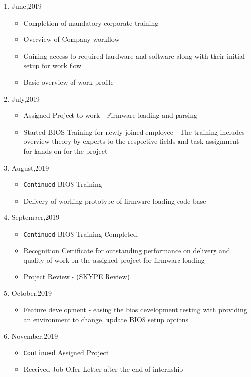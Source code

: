 \begin{enumerate}
    \item June,2019
    	\begin{itemize}
    		\item Completion of mandatory corporate training
    		\item Overview of Company workflow
    		\item Gaining access to required hardware and software along with their initial setup for work flow
    		\item Basic overview of work profile
    	\end{itemize}
    \item July,2019
    	\begin{itemize}
    		\item Assigned Project to work - Firmware loading and parsing
    		\item Started BIOS Training for newly joined employee - The training includes overview theory by experts to the respective fields and task assignment for hands-on for the project.
    	\end{itemize}
    \item August,2019
	    \begin{itemize}
	    	\item \verb|Continued| BIOS Training
	    	\item Delivery of working prototype of firmware loading code-base
	    \end{itemize}
    \item September,2019
	    \begin{itemize}
	    	\item \verb|Continued| BIOS Training Completed.
	    	\item Recognition Certificate for outstanding performance on delivery and quality of work on the assigned project for firmware loading
	    	\item Project Review - (SKYPE Review)
	    \end{itemize}
    \item October,2019
	    \begin{itemize}
	    	\item Feature development - easing the bios development testing with providing an environment to change, update BIOS setup options
	    \end{itemize}
	\item November,2019
	    \begin{itemize}
	    	\item \verb|Continued| Assigned Project
	    	\item Received Job Offer Letter after the end of internship
	    \end{itemize}
\end{enumerate}